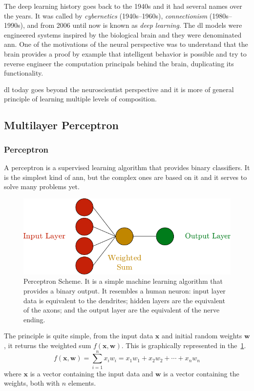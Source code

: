 The deep learning history goes back to the 1940s and it had several names over the years. It was called by \emph{cybernetics} (1940s--1960s), \emph{connectionism} (1980s--1990s), and from 2006 until now is known as \emph{deep learning}.
The \gls*{dl} models were engineered systems inspired by the biological brain and they were denominated \gls*{ann}.
One of the motivations of the neural perspective was to understand that the brain provides a proof by example that intelligent behavior is possible and try to reverse engineer the computation principals behind the brain, duplicating its functionality.

\gls*{dl} today goes beyond the neuroscientist perspective and it is more of general principle of learning multiple levels of composition.

\subsection{Multilayer Perceptron}

\subsubsection*{Perceptron}

A perceptron is a supervised learning algorithm that provides binary classifiers. It is the simplest kind of \gls*{ann}, but the complex ones are based on it and it serves to solve many problems yet.

\begin{figure}
    \centering
    \includegraphics{figures/2methodology/nn/perceptron.pdf}
    \caption[Perceptron Scheme]{Perceptron Scheme. It is a simple machine learning algorithm that provides a binary output. It resembles a human neuron: input layer data is equivalent to the dendrites; hidden layers are the equivalent of the axons; and the output layer are the equivalent of the nerve ending.}
    \label{fig:perceptron}
\end{figure}

The principle is quite simple, from the input data \(\mathbf{x}\) and initial random weights \(\mathbf{w}\), it returns the weighted sum \(f(\mathbf{x},\mathbf{w})\). This is graphically represented in the~\cref{fig:perceptron}.
%
\begin{equation}\label{eq:perceptron_weighted_sum}
    f(\mathbf{x},\mathbf{w}) = \sum_{i=1}^n x_iw_i =  x_1w_1 + x_2w_2 + \cdots + x_nw_n
\end{equation}
%
where \(\mathbf{x}\) is a vector containing the input data and \(\mathbf{w}\) is a vector containing the weights, both with \(n\) elements.

